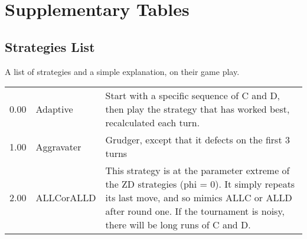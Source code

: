 \section{Supplementary Tables}
\subsection{Strategies List}
\label{append:strategies}
A list of strategies and a simple explanation, on their game play.

\begin{table}[!hbtp]
	\centering
	\begin{adjustbox}{width=2\textwidth, angle=90}
		\small
		\begin{tabular}{rll}
				\toprule
	0.00   & Adaptive                    & Start with a specific sequence of C and D, then play the strategy that
	has worked best, recalculated each turn.                                                                                                                                                                                                                                                                                                                                                                                                                                                                                                                                                                                                                                                                                                                                                                                                                                                                                                      \\
	1.00   & Aggravater                  & Grudger, except that it defects on the first 3 turns                                                                              \\
	2.00   & ALLCorALLD                  & This strategy is at the parameter extreme of the ZD strategies (phi = 0).
	It simply repeats its last move, and so mimics ALLC or ALLD after round one.
	If the tournament is noisy, there will be long runs of C and D.


\end{tabular}
\end{adjustbox}
\end{table}
